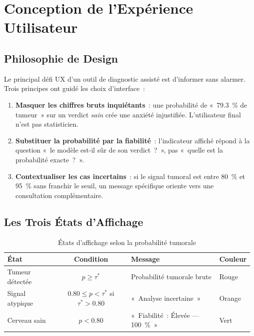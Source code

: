 \documentclass[12pt, a4paper]{report}
\begin{document}
\section{Conception de l'Expérience Utilisateur}
\label{sec:ux}

\subsection{Philosophie de Design}

Le principal défi UX d'un outil de diagnostic assisté est d'informer
sans alarmer. Trois principes ont guidé les choix d'interface~:

\begin{enumerate}
  \item \textbf{Masquer les chiffres bruts inquiétants}~: une probabilité
        de «~79.3~\% de tumeur~» sur un verdict \textit{sain} crée une
        anxiété injustifiée. L'utilisateur final n'est pas statisticien.

  \item \textbf{Substituer la probabilité par la fiabilité}~: l'indicateur
        affiché répond à la question «~le modèle est-il sûr de son
        verdict~?~», pas «~quelle est la probabilité exacte~?~».

  \item \textbf{Contextualiser les cas incertains}~: si le signal tumoral
        est entre 80~\% et 95~\% sans franchir le seuil, un message
        spécifique oriente vers une consultation complémentaire.
\end{enumerate}

\subsection{Les Trois États d'Affichage}

\begin{table}[h]
  \centering
  \caption{États d'affichage selon la probabilité tumorale}
  \label{tab:etats_affichage}
  \begin{tabularx}{\textwidth}{lcXl}
    \toprule
    \textbf{État} & \textbf{Condition} & \textbf{Message} & \textbf{Couleur} \\
    \midrule
    Tumeur détectée
      & $p \geq \tau^*$
      & Probabilité tumorale brute
      & Rouge \\
    Signal atypique
      & $0.80 \leq p < \tau^*$ si $\tau^* > 0.80$
      & «~Analyse incertaine~»
      & Orange \\
    Cerveau sain
      & $p < 0.80$
      & «~Fiabilité~: Élevée — 100~\%~»
      & Vert \\
    \bottomrule
  \end{tabularx}
\end{table}
\end{document}
